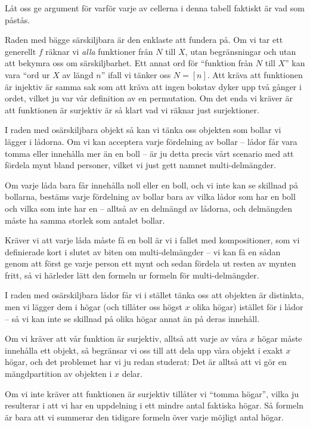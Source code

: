 \documentclass[nobib]{tufte-handout}
\begin{document}
Låt oss ge argument för varför varje av cellerna i denna tabell faktiskt är vad som påstås.

Raden med bägge särskiljbara är den enklaste att fundera på. Om vi tar ett generellt $f$ räknar vi \emph{alla} funktioner från $N$ till $X$, utan begränsningar och utan att bekymra oss om särskiljbarhet. Ett annat ord för ``funktion från $N$ till $X$'' kan vara ``ord ur $X$ av längd $n$'' ifall vi tänker oss $N = [n]$. Att kräva att funktionen är injektiv är samma sak som att kräva att ingen bokstav dyker upp två gånger i ordet, vilket ju var vår definition av en permutation. Om det enda vi kräver är att funktionen är surjektiv är så klart vad vi räknar just surjektioner.

I raden med osärskiljbara objekt så kan vi tänka oss objekten som bollar vi lägger i lådorna. Om vi kan acceptera varje fördelning av bollar -- lådor får vara tomma eller innehålla mer än en boll -- är ju detta precis vårt scenario med att fördela mynt bland personer, vilket vi just gett namnet multi-delmängder. 

Om varje låda bara får innehålla noll eller en boll, och vi inte kan se skillnad på bollarna, bestäms varje fördelning av bollar bara av vilka lådor som har en boll och vilka som inte har en -- alltså av en delmängd av lådorna, och delmängden måste ha samma storlek som antalet bollar. 

Kräver vi att varje låda måste få en boll är vi i fallet med kompositioner, som vi definierade kort i slutet av biten om multi-delmängder -- vi kan få en sådan genom att först ge varje person ett mynt och sedan fördela ut resten av mynten fritt, så vi härleder lätt den formeln ur formeln för multi-delmängder.

I raden med osärskiljbara lådor får vi i stället tänka oss att objekten är distinkta, men vi lägger dem i högar (och tillåter oss högst $x$ olika högar) istället för i lådor -- så vi kan inte se skillnad på olika högar annat än på deras innehåll. 

Om vi kräver att vår funktion är surjektiv, alltså att varje av våra $x$ högar måste innehålla ett objekt, så begränsar vi oss till att dela upp våra objekt i exakt $x$ högar, och det problemet har vi ju redan studerat: Det är alltså att vi gör en mängdpartition av objekten i $x$ delar. 

Om vi inte kräver att funktionen är surjektiv tillåter vi ``tomma högar'', vilka ju resulterar i att vi har en uppdelning i ett mindre antal faktiska högar. Så formeln är bara att vi summerar den tidigare formeln över varje möjligt antal högar.
\end{document}
